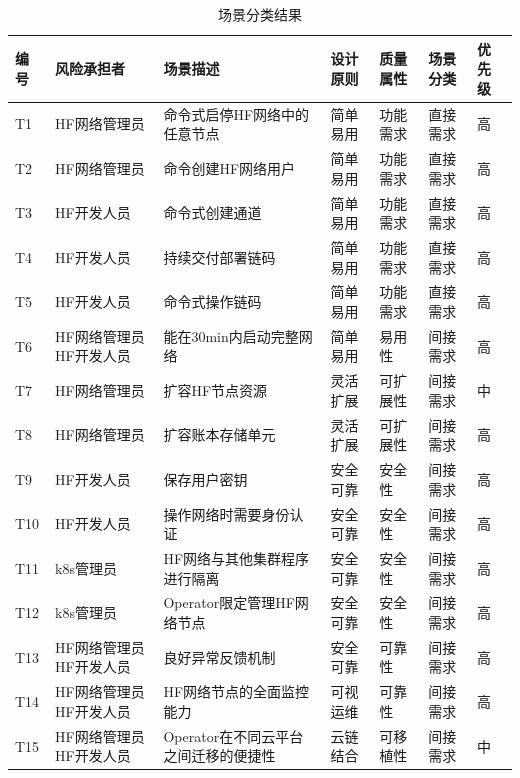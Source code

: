 {\footnotesize
\begin{longtable}[h]{m{20pt} m{60pt} m{90pt} m{40pt} m{40pt} m{40pt} m{30pt}}
    \caption[场景分类结果]{场景分类结果} \label{saam_step3}\\
        \toprule  
        \textbf{编号}&\textbf{风险承担者}&\textbf{场景描述}&\textbf{设计原则}&\textbf{质量属性}&\textbf{场景分类}&\textbf{优先级}\\
        \hline
        T1&  HF网络管理员 & 命令式启停HF网络中的任意节点 & 简单易用  & 功能需求 & 直接需求 &  高 \\
        \hline
        T2&  HF网络管理员 & 命令创建HF网络用户 & 简单易用 & 功能需求 & 直接需求 &  高 \\
        \hline
        T3&  HF开发人员 & 命令式创建通道 & 简单易用 & 功能需求 & 直接需求 &  高 \\
        \hline
        T4&  HF开发人员 & 持续交付部署链码 & 简单易用 & 功能需求 & 直接需求 &  高 \\
        \hline
        T5&  HF开发人员 & 命令式操作链码 & 简单易用 & 功能需求 & 直接需求 &  高 \\
        \hline
        T6&  HF网络管理员 \newline HF开发人员 & 能在30min内启动完整网络 & 简单易用 & 易用性 & 间接需求 &  高 \\
        \hline
        T7&  HF网络管理员 & 扩容HF节点资源 & 灵活扩展 & 可扩展性 & 间接需求 &  中 \\
        \hline
        T8&  HF网络管理员 & 扩容账本存储单元 & 灵活扩展 & 可扩展性 & 间接需求 &  高 \\
        \hline
        T9&  HF开发人员 & 保存用户密钥 & 安全可靠 & 安全性 & 间接需求 &  高 \\
        \hline
        T10&  HF开发人员 & 操作网络时需要身份认证 & 安全可靠 & 安全性 & 间接需求 &  高 \\
        \hline    
        T11&  k8s管理员 & HF网络与其他集群程序进行隔离 & 安全可靠 & 安全性 & 间接需求 &  高 \\
        \hline
        T12&  k8s管理员 & Operator限定管理HF网络节点 & 安全可靠 & 安全性 & 间接需求 &  高 \\
        \hline
        T13&  HF网络管理员 \newline HF开发人员 & 良好异常反馈机制 & 安全可靠 & 可靠性 & 间接需求 &  高 \\
        \hline
        T14&  HF网络管理员 \newline HF开发人员 & HF网络节点的全面监控能力 & 可视运维 & 可靠性 & 间接需求 &  高 \\
        \hline
        T15&  HF网络管理员 \newline HF开发人员 & Operator在不同云平台之间迁移的便捷性 & 云链结合 & 可移植性 & 间接需求 &  中 \\
        \bottomrule
    \end{longtable} 
}

